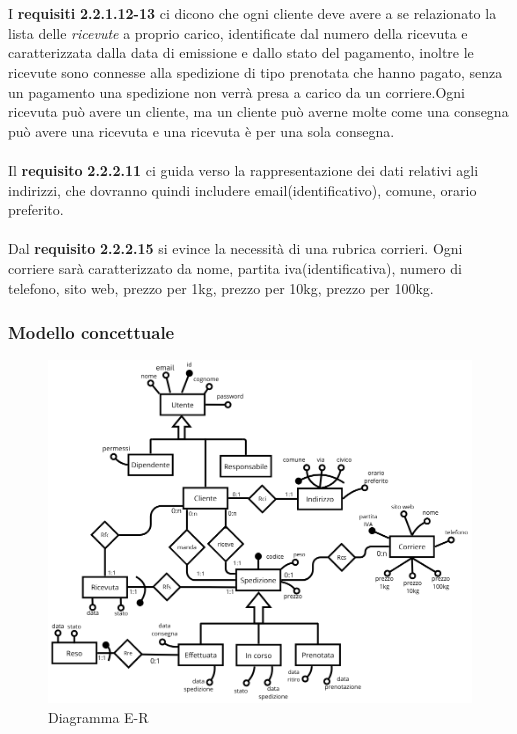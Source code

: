 \\\\
I \textbf{requisiti} \textbf{2.2.1.12-13} ci dicono che ogni cliente deve avere a se relazionato la lista delle \textit{ricevute} a proprio carico, identificate dal numero della ricevuta e caratterizzata dalla data di emissione e dallo stato del pagamento, inoltre le ricevute sono connesse alla spedizione di tipo prenotata che hanno pagato, senza un pagamento una spedizione non verrà presa a carico da un corriere.Ogni ricevuta può avere un cliente, ma un cliente può averne molte come una consegna può avere una ricevuta e una ricevuta è per una sola consegna.
\\\\
Il \textbf{requisito} \textbf{2.2.2.11} ci guida verso la rappresentazione dei dati relativi agli indirizzi, che dovranno quindi includere 
email(identificativo), comune, orario preferito. \\ \\
Dal \textbf{requisito} \textbf{2.2.2.15} si evince la necessità di una rubrica corrieri. Ogni corriere sarà caratterizzato da nome, 
partita iva(identificativa), numero di telefono, sito web, prezzo per 1kg, prezzo per 10kg, prezzo per 100kg.

\subsubsection{Modello concettuale}
\begin{figure}[H]
  \centering
  \includegraphics[width=\textwidth]{assets/ER_diagram.png}
  \caption{Diagramma E-R}
\end{figure}
